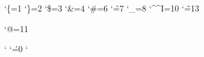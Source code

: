 
\catcode`\{=1
\catcode`\}=2
\catcode`\$=3
\catcode`\&=4
\catcode`\#=6
\catcode`\^=7
\catcode`\_=8
\catcode`\^^I=10
\catcode`\~=13

\catcode`@=11

\sfcode` \sfcode`\'=0 \sfcode`

